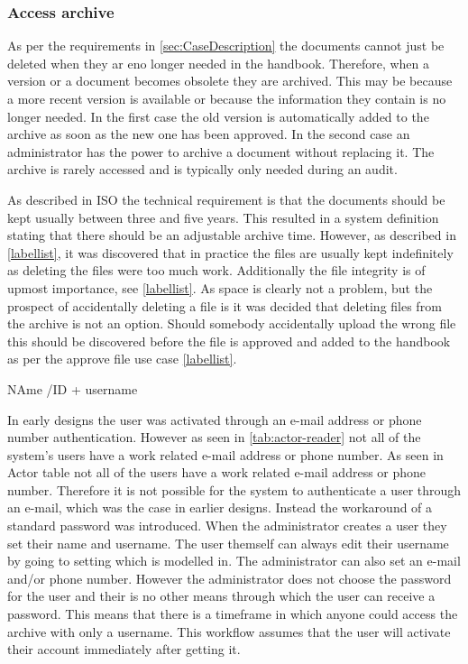 \subsubsection{Access archive}
As per the requirements in \cref{sec:CaseDescription} the documents cannot just be deleted when they ar eno longer needed in the handbook.
Therefore, when a version or a document becomes obsolete they are archived.
This may be because a more recent version is available or because the information they contain is no longer needed.
In the first case the old version is automatically added to the archive as soon as the new one has been approved.
In the second case an administrator has the power to archive a document without replacing it.
The archive is rarely accessed and is typically only needed during an audit.




As described in ISO the technical requirement is that the documents should be kept usually between three and five years.
This resulted in a system definition stating that there should be an adjustable archive time.
However, as described in \cref{labellist}, it was discovered that in practice the files are usually kept indefinitely as deleting the files were too much work.
Additionally the file integrity is of upmost importance, see \cref{labellist}.
As space is clearly not a problem, but the prospect of accidentally deleting a file is it was decided that deleting files from the archive is not an option.
Should somebody accidentally upload the wrong file this should be discovered before the file is approved and added to the handbook as per the approve file use case \cref{labellist}.


%

NAme /ID + username

In early designs the user was activated through an e-mail address or phone number authentication.
However as seen in \cref{tab:actor-reader} not all of the system's users have a work related e-mail address or phone number.
As seen in Actor table not all of the users have a work related e-mail address or phone number.
Therefore it is not possible for the system to authenticate a user through an e-mail, which was the case in earlier designs.
Instead the workaround of a standard password was introduced.
When the administrator creates a user they set their name and username.
The user themself can always edit their username by going to setting which is modelled in.
The administrator can also set an e-mail and/or phone number.
However the administrator does not choose the password for the user and their is no other means through which the user can receive a password.
This means that there is a timeframe in which anyone could access the archive with only a username.
This workflow assumes that the user will activate their account immediately after getting it.

